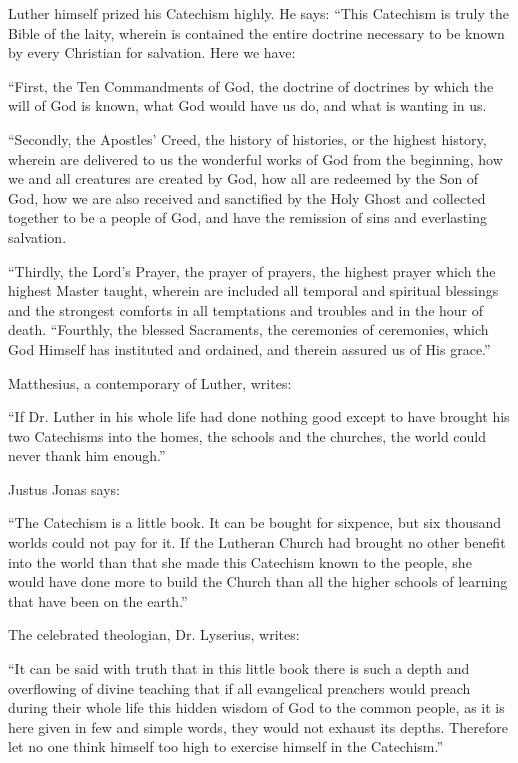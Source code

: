  Luther himself prized his Catechism highly. He says: “This Catechism is truly the Bible of the laity, wherein is contained the entire doctrine necessary to be known by every Christian for salvation. Here we have:

“First, the Ten Commandments of God, the doctrine of doctrines by which the will of God is known, what God would have us do, and what is wanting in us.

“Secondly, the Apostles’ Creed, the history of histories, or the highest history, wherein are delivered to us the wonderful works of God from the beginning, how we and all creatures are created by God, how all are redeemed by the Son of God, how we are also received and sanctified by the Holy Ghost and collected together to be a people of God, and have the remission of sins and everlasting salvation.

“Thirdly, the Lord’s Prayer, the prayer of prayers, the highest prayer which the highest Master taught, wherein are included all temporal and spiritual blessings and the strongest comforts in all temptations and troubles and in the hour of death.
“Fourthly, the blessed Sacraments, the ceremonies of ceremonies, which God Himself has instituted and ordained, and therein assured us of His grace.”

Matthesius, a contemporary of Luther, writes:

“If Dr. Luther in his whole life had done nothing good except to have brought his two Catechisms into the homes, the schools and the churches, the world could never thank him enough.”

 Justus Jonas says:

“The Catechism is a little book. It can be bought for sixpence, but six thousand worlds could not pay for it. If the Lutheran Church had brought no other benefit into the world than that she made this Catechism known to the people, she would have done more to build the Church than all the higher schools of learning that have been on the earth.”

The celebrated theologian, Dr. Lyserius, writes:

“It can be said with truth that in this little book there is such a depth and overflowing of divine teaching that if all evangelical preachers would preach during their whole life this hidden wisdom of God to the common people, as it is here given in few and simple words, they would not exhaust its depths. Therefore let no one think himself too high to exercise himself in the Catechism.”

